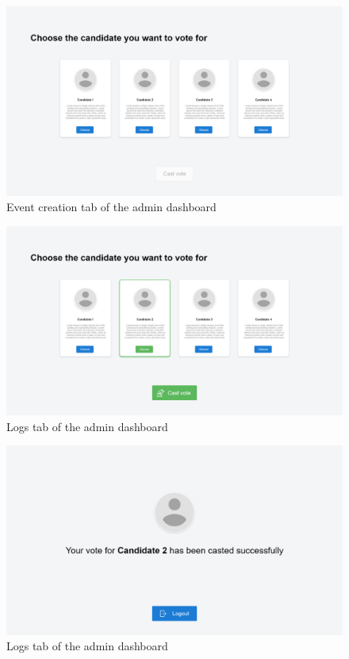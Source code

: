 \begin{figure}[H]
	\centering
		\includegraphics[width=14cm]{images/chapter3/voter_3.png}
		\caption{{\footnotesize Event creation tab of the admin dashboard}}
\end{figure}

\begin{figure}[H]
	\centering
		\includegraphics[width=14cm]{images/chapter3/voter_4.png}
		\caption{{\footnotesize Logs tab of the admin dashboard}}
\end{figure}

\begin{figure}[H]
	\centering
		\includegraphics[width=14cm]{images/chapter3/voter_5.png}
		\caption{{\footnotesize Logs tab of the admin dashboard}}
\end{figure}
\newpage

